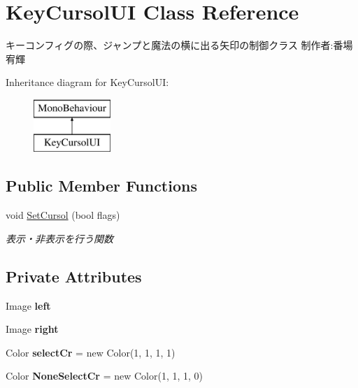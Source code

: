 \hypertarget{class_key_cursol_u_i}{}\section{Key\+Cursol\+UI Class Reference}
\label{class_key_cursol_u_i}


キーコンフィグの際、ジャンプと魔法の横に出る矢印の制御クラス 制作者\+:番場宥輝  


Inheritance diagram for Key\+Cursol\+UI\+:\begin{figure}[H]
\begin{center}
\leavevmode
\includegraphics[height=2.000000cm]{class_key_cursol_u_i}
\end{center}
\end{figure}
\subsection*{Public Member Functions}
\begin{DoxyCompactItemize}
\item 
void \hyperlink{class_key_cursol_u_i_abe6520ce52d158f778b1fc81d88c1ee3}{Set\+Cursol} (bool flags)
\begin{DoxyCompactList}\small\item\em 表示・非表示を行う関数 \end{DoxyCompactList}\end{DoxyCompactItemize}
\subsection*{Private Attributes}
\begin{DoxyCompactItemize}
\item 
\mbox{\label{class_key_cursol_u_i_af2c335ea90804f45f370814f9edd2028}} 
Image {\bfseries left}
\item 
\mbox{\label{class_key_cursol_u_i_a2c84f3490d1f1263c1f950f0d3feaea7}} 
Image {\bfseries right}
\item 
\mbox{\label{class_key_cursol_u_i_a2926f5986f4644efc95681c56ed33139}} 
Color {\bfseries select\+Cr} = new Color(1, 1, 1, 1)
\item 
\mbox{\label{class_key_cursol_u_i_a8c1eeb34a22b14003694e57b49372ca4}} 
Color {\bfseries None\+Select\+Cr} = new Color(1, 1, 1, 0)
\end{DoxyCompactItemize}


